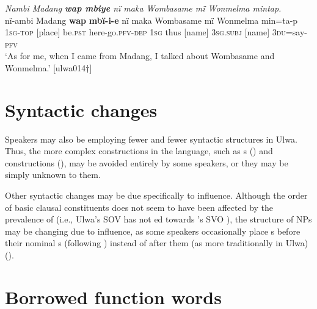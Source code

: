 
\newpage

\ea%
    \label{ex:loss:10}
          \textit{Nambi Madang \textbf{wap mbiye} nï maka Wombasame mï Wonmelma mintap.}\\
\gll    nï-ambi  Madang  \textbf{wap}  \textbf{mbï-i-e}      nï    maka Wombasame  mï      Wonmelma    min=ta-p\\
    1\textsc{sg-top}  [place]    be.\textsc{pst}  here-go.\textsc{pfv-dep}  \textsc{1sg}  thus    [name]      \textsc{3sg.subj}  [name]      \textsc{3du}=say-\textsc{pfv}\\
\glt `As for me, when I came from Madang, I talked about Wombasame and Wonmelma.’ [ulwa014†]
\z

\section{Syntactic changes}\label{sec:15.4}


Speakers may also be employing fewer and fewer syntactic structures in Ulwa. Thus, the more complex constructions in the language, such as s () and  constructions (), may be avoided entirely by some speakers, or they may be simply unknown to them.

  Other syntactic changes may be due specifically to  influence. Although the order of basic clausal constituents does not seem to have been affected by the prevalence of  (i.e., Ulwa’s SOV  has not ed towards ’s SVO ), the structure of NPs may be changing due to  influence, as some speakers occasionally place s before their nominal s (following  ) instead of after them (as more traditionally in Ulwa) ().




\section{Borrowed function words}\label{sec:15.5}

